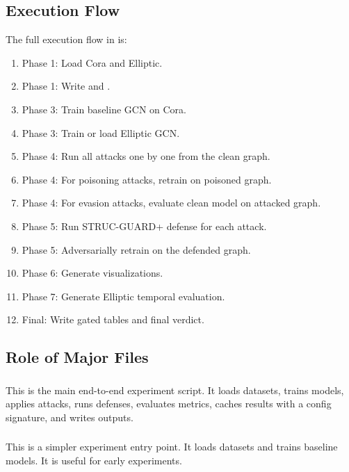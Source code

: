\documentclass[12pt,a4paper]{article}
\begin{document}
\subsection{Execution Flow}
The full execution flow in  is:

\begin{enumerate}
    \item Phase 1: Load Cora and Elliptic.
    \item Phase 1: Write  and .
    \item Phase 3: Train baseline GCN on Cora.
    \item Phase 3: Train or load Elliptic GCN.
    \item Phase 4: Run all attacks one by one from the clean graph.
    \item Phase 4: For poisoning attacks, retrain on poisoned graph.
    \item Phase 4: For evasion attacks, evaluate clean model on attacked graph.
    \item Phase 5: Run STRUC-GUARD+ defense for each attack.
    \item Phase 5: Adversarially retrain on the defended graph.
    \item Phase 6: Generate visualizations.
    \item Phase 7: Generate Elliptic temporal evaluation.
    \item Final: Write gated tables and final verdict.
\end{enumerate}

\subsection{Role of Major Files}

\subsubsection{}
This is the main end-to-end experiment script. It loads datasets, trains models, applies attacks, runs defenses, evaluates metrics, caches results with a config signature, and writes outputs.

\subsubsection{}
This is a simpler experiment entry point. It loads datasets and trains baseline models. It is useful for early experiments.
\end{document}
